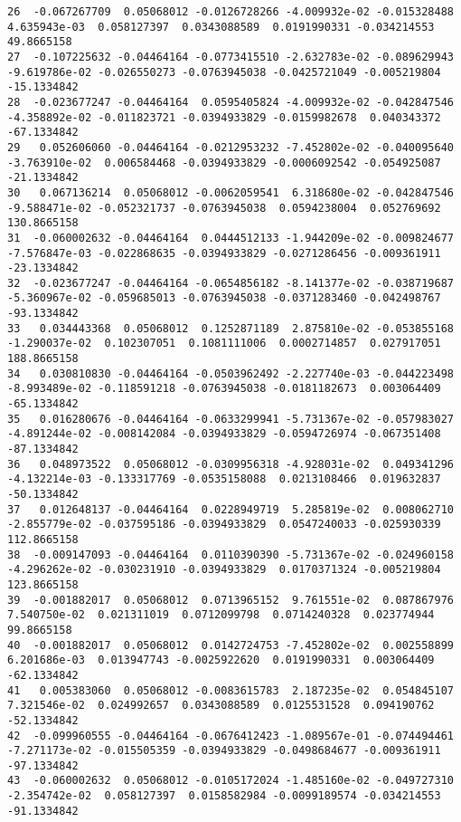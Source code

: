 \documentclass[15pt,a4paper,openright]{article}
\begin{document}
\begin{lstlisting}[language=AMPL, caption = data file]
26  -0.067267709  0.05068012 -0.0126728266 -4.009932e-02 -0.015328488  4.635943e-03  0.058127397  0.0343088589  0.0191990331 -0.034214553   49.8665158
27  -0.107225632 -0.04464164 -0.0773415510 -2.632783e-02 -0.089629943 -9.619786e-02 -0.026550273 -0.0763945038 -0.0425721049 -0.005219804  -15.1334842
28  -0.023677247 -0.04464164  0.0595405824 -4.009932e-02 -0.042847546 -4.358892e-02 -0.011823721 -0.0394933829 -0.0159982678  0.040343372  -67.1334842
29   0.052606060 -0.04464164 -0.0212953232 -7.452802e-02 -0.040095640 -3.763910e-02  0.006584468 -0.0394933829 -0.0006092542 -0.054925087  -21.1334842
30   0.067136214  0.05068012 -0.0062059541  6.318680e-02 -0.042847546 -9.588471e-02 -0.052321737 -0.0763945038  0.0594238004  0.052769692  130.8665158
31  -0.060002632 -0.04464164  0.0444512133 -1.944209e-02 -0.009824677 -7.576847e-03 -0.022868635 -0.0394933829 -0.0271286456 -0.009361911  -23.1334842
32  -0.023677247 -0.04464164 -0.0654856182 -8.141377e-02 -0.038719687 -5.360967e-02 -0.059685013 -0.0763945038 -0.0371283460 -0.042498767  -93.1334842
33   0.034443368  0.05068012  0.1252871189  2.875810e-02 -0.053855168 -1.290037e-02  0.102307051  0.1081111006  0.0002714857  0.027917051  188.8665158
34   0.030810830 -0.04464164 -0.0503962492 -2.227740e-03 -0.044223498 -8.993489e-02 -0.118591218 -0.0763945038 -0.0181182673  0.003064409  -65.1334842
35   0.016280676 -0.04464164 -0.0633299941 -5.731367e-02 -0.057983027 -4.891244e-02 -0.008142084 -0.0394933829 -0.0594726974 -0.067351408  -87.1334842
36   0.048973522  0.05068012 -0.0309956318 -4.928031e-02  0.049341296 -4.132214e-03 -0.133317769 -0.0535158088  0.0213108466  0.019632837  -50.1334842
37   0.012648137 -0.04464164  0.0228949719  5.285819e-02  0.008062710 -2.855779e-02 -0.037595186 -0.0394933829  0.0547240033 -0.025930339  112.8665158
38  -0.009147093 -0.04464164  0.0110390390 -5.731367e-02 -0.024960158 -4.296262e-02 -0.030231910 -0.0394933829  0.0170371324 -0.005219804  123.8665158
39  -0.001882017  0.05068012  0.0713965152  9.761551e-02  0.087867976  7.540750e-02  0.021311019  0.0712099798  0.0714240328  0.023774944   99.8665158
40  -0.001882017  0.05068012  0.0142724753 -7.452802e-02  0.002558899  6.201686e-03  0.013947743 -0.0025922620  0.0191990331  0.003064409  -62.1334842
41   0.005383060  0.05068012 -0.0083615783  2.187235e-02  0.054845107  7.321546e-02  0.024992657  0.0343088589  0.0125531528  0.094190762  -52.1334842
42  -0.099960555 -0.04464164 -0.0676412423 -1.089567e-01 -0.074494461 -7.271173e-02 -0.015505359 -0.0394933829 -0.0498684677 -0.009361911  -97.1334842
43  -0.060002632  0.05068012 -0.0105172024 -1.485160e-02 -0.049727310 -2.354742e-02  0.058127397  0.0158582984 -0.0099189574 -0.034214553  -91.1334842

\end{lstlisting}
\end{document}
